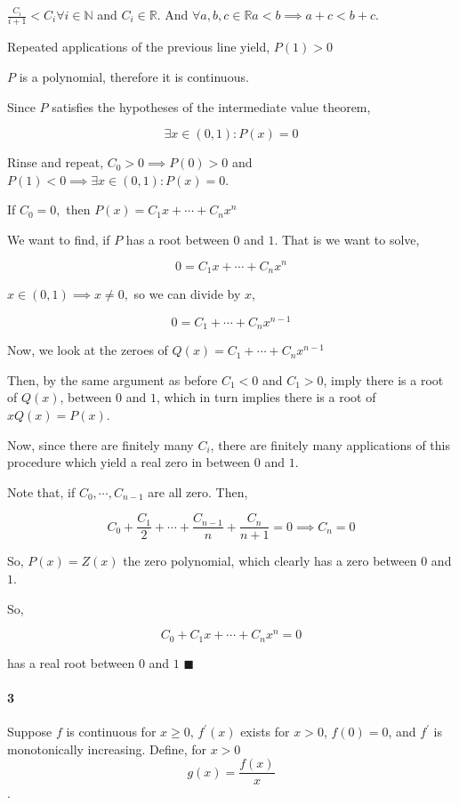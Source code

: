 \documentclass{article}
\newcommand\N{\mathbb{N}}
\newcommand\R{\mathbb{R}}
\begin{document}
$\frac{C_i}{i+1} < C_i \forall i \in \N$ and $C_i \in \R$. And
$\forall a,b,c \in \R a<b \implies a + c < b +c$.

Repeated applications of the previous line yield,
$P(1) > 0$

$P$ is a polynomial, therefore it is continuous.

Since $P$ satisfies the hypotheses of the intermediate value theorem,

\[\exists x\in(0,1): P(x)=0\]

Rinse and repeat, $C_0 > 0 \implies P(0) > 0$ and $P(1)<0 \implies
\exists x\in(0,1): P(x)=0$.

If $C_0 = 0,$ then $P(x) = C_1x + \cdots+ C_n x^n$

We want to find, if $P$ has a root between $0$ and $1$. That is we
want to solve,

\[0 = C_1x + \cdots+ C_n x^n\]

$x \in(0,1) \implies  x \neq 0,$ so we can divide by $x$,

\[0 = C_1 + \cdots+ C_n x^{n-1}\]

Now, we look at the zeroes of $Q(x) = C_1 + \cdots+ C_n x^{n-1}$

Then, by the same argument as before $C_1<0$ and $C_1 >0$, imply there
is a root of $Q(x)$, between $0$ and $1$, which in turn implies there is
a root of $xQ(x) = P(x)$.

Now, since there are finitely many $C_i$, there are finitely many
applications of this procedure which yield a real zero in
between $0$ and $1$.

Note that, if $C_0,\cdots, C_{n-1}$ are all zero. Then,

\[C_0 +\frac{C_1}{2}+\cdots + \frac{C_{n-1}}{n} +\frac{C_n}{n+1} = 0
  \implies C_n = 0\]

So, $P(x) = Z(x)$ the zero polynomial, which clearly has a zero
between $0$ and $1$.



So,

\[C_0 +C_1 x+\cdots+C_n x^n = 0\]

has a real root between $0$ and $1$
$\blacksquare$

\paragraph{3} Suppose $f$ is continuous for $x ≥ 0$, $f^\prime(x)$ exists for $x > 0$, $f(0) = 0$, and $f^\prime$
is monotonically
increasing. Define, for $x > 0$
\[g(x) = \frac{f(x)}{x}\].
\end{document}
